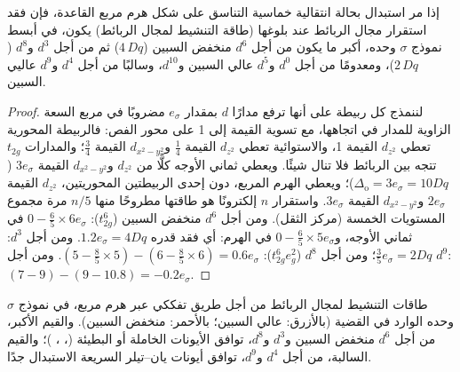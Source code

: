 \begin{proposition}\label{prop:b3:complex-mechanisms:lfae}
إذا مر استبدال بحالة انتقالية خماسية التناسق على شكل هرم مربع القاعدة،
فإن فقد استقرار مجال الربائط عند بلوغها (طاقة التنشيط
لمجال الربائط) يكون، في أبسط نموذج $\sigma$ وحده، أكبر ما يكون من أجل $d^6$ منخفض السبين
($4\,Dq$) ثم من أجل $d^3$ و$d^8$ ($2\,Dq$)، ومعدومًا من أجل $d^0$ و$d^5$ عالي السبين و$d^{10}$، وسالبًا
من أجل $d^4$ و$d^9$ عاليي السبين.
\end{proposition}

\begin{proof}
لننمذج كل ربيطة على أنها ترفع مدارًا $d$ بمقدار $e_\sigma$ مضروبًا في مربع السعة
الزاوية للمدار في اتجاهها، مع تسوية القيمة إلى 1 على محور الفص: فالربيطة
المحورية تعطي $d_{z^2}$ القيمة 1، والاستوائية تعطي $d_{z^2}$ القيمة $\frac14$ و$d_{x^2-y^2}$ القيمة $\frac34$؛ والمدارات $t_{2g}$ تتجه
بين الربائط فلا تنال شيئًا. ويعطي ثماني الأوجه كلًّا من $d_{z^2}$ و$d_{x^2-y^2}$ القيمة $3e_\sigma$
($\Delta_{\mathrm o} = 3e_\sigma = 10Dq$)؛ ويعطي الهرم المربع، دون إحدى الربيطتين المحوريتين، $d_{z^2}$ القيمة $2e_\sigma$ 
و$d_{x^2-y^2}$ القيمة $3e_\sigma$. واستقرار $n$ إلكترونًا هو طاقتها مطروحًا منها $n/5$ مرة مجموع
المستويات الخمسة (مركز الثقل). ومن أجل $d^6$ منخفض السبين ($t_{2g}^6$): $0 - \frac65 \times 6e_\sigma$ في
ثماني الأوجه، و$0 - \frac65 \times 5e_\sigma$ في الهرم: أي فقد قدره $1.2e_\sigma = 4Dq$. ومن أجل $d^3$: $\frac35e_\sigma =
2Dq$؛ ومن أجل $d^8$ ($t_{2g}^6e_g^2$): $(5 - \frac85 \times 5) - (6 - \frac85 \times 6) = 0.6e_\sigma$. ومن أجل $d^9$: $(7 - 9) - (9 -
10.8) = -0.2e_\sigma$.
\end{proof}

\begin{omfigure}

{\small طاقات التنشيط لمجال الربائط من أجل طريق تفككي عبر
هرم مربع، في نموذج $\sigma$ وحده الوارد في القضية (بالأزرق: عالي السبين؛
بالأحمر: منخفض السبين). والقيم الأكبر،
من أجل $d^6$ منخفض السبين و$d^3$ و$d^8$، توافق الأيونات الخاملة أو البطيئة (، ، )؛
والقيم السالبة، من أجل $d^4$ و$d^9$، توافق أيونات يان--تيلر السريعة الاستبدال جدًا.}
\end{omfigure}

